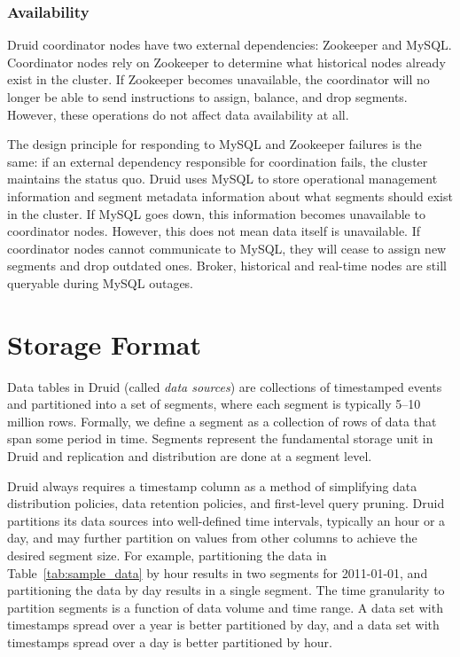 \documentclass{acm_proc_article-sp}
\begin{document}
\subsubsection{Availability}
Druid coordinator nodes have two external dependencies: Zookeeper and MySQL.
Coordinator nodes rely on Zookeeper to determine what historical nodes already
exist in the cluster. If Zookeeper becomes unavailable, the coordinator will no
longer be able to send instructions to assign, balance, and drop segments.
However, these operations do not affect data availability at all.

The design principle for responding to MySQL and Zookeeper failures is the
same: if an external dependency responsible for coordination fails, the cluster
maintains the status quo. Druid uses MySQL to store operational management
information and segment metadata information about what segments should exist
in the cluster.  If MySQL goes down, this information becomes unavailable to
coordinator nodes. However, this does not mean data itself is unavailable. If
coordinator nodes cannot communicate to MySQL, they will cease to assign new
segments and drop outdated ones. Broker, historical and real-time nodes are still
queryable during MySQL outages.

\section{Storage Format}
\label{sec:storage-format}
Data tables in Druid (called \emph{data sources}) are collections of
timestamped events and partitioned into a set of segments, where each segment
is typically 5--10 million rows. Formally, we define a segment as a collection
of rows of data that span some period in time. Segments represent the
fundamental storage unit in Druid and replication and distribution are done at
a segment level.
 
Druid always requires a timestamp column as a method of simplifying data
distribution policies, data retention policies, and first-level query pruning.
Druid partitions its data sources into well-defined time intervals, typically
an hour or a day, and may further partition on values from other columns to
achieve the desired segment size.  For example, partitioning the data in
Table~\ref{tab:sample_data} by hour results in two segments for 2011-01-01, and
partitioning the data by day results in a single segment.  The time granularity
to partition segments is a function of data volume and time range. A data set
with timestamps spread over a year is better partitioned by day, and a data set
with timestamps spread over a day is better partitioned by hour.
\end{document}
